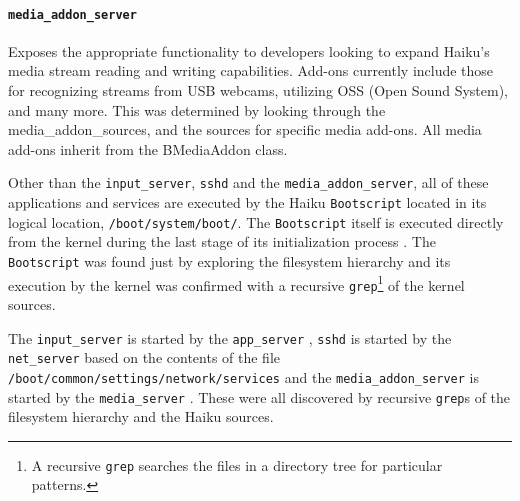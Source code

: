 \documentclass{article}
\begin{document}
\paragraph{\texttt{media\_addon\_server}}
Exposes the appropriate functionality to developers looking to expand
Haiku's media stream reading and writing capabilities. Add-ons currently 
include those for recognizing streams from USB webcams, utilizing OSS 
(Open Sound System), and many more. This was determined by looking through 
the media\_addon\_sources, and the sources for specific media add-ons.
All media add-ons inherit from the BMediaAddon class. \cite{BMediaAddon} 

Other than the \texttt{input\_server}, \texttt{sshd} and
the \texttt{media\_addon\_server}, all of these applications and
services are executed by the Haiku \texttt{Bootscript} located in its
logical location, \texttt{/boot/system/boot/}.
The \texttt{Bootscript} itself is executed directly from the kernel
during the last stage of its initialization
process \cite{HaikuKernelMain}.  The \texttt{Bootscript} was found
just by exploring the filesystem hierarchy and its execution by the
kernel was confirmed with a recursive \texttt{grep}\footnote{A
recursive \texttt{grep} searches the files in a directory tree for
particular patterns.} of the kernel sources.

The \texttt{input\_server} is started by
the \texttt{app\_server} \cite{AppServerDesktopSource}, \texttt{sshd}
is started by
the \texttt{net\_server} \cite{NetServerSettingsSource, NetServerServicesSource}
based on the contents of the
file \texttt{/boot/common/settings/network/services} and
the \texttt{media\_addon\_server} is started by
the \texttt{media\_server} \cite{MediaServerSource}.  These were all
discovered by recursive \texttt{grep}s of the filesystem hierarchy and
the Haiku sources.

{}

\end{document}
